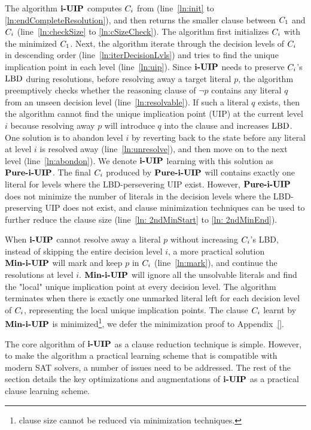 The algorithm $\textbf{i-UIP}$ computes $C_{i}$ from (line~\ref{ln:init} to \ref{ln:endCompleteResolution}), and then returns the smaller clause between 
$C_{1}$ and $C_{i}$ (line~\ref{ln:checkSize} to \ref{ln:cSizeCheck}). 
The algorithm first initializes $C_{i}$ with the minimized\cite{} $C_{1}$. Next, the algorithm iterate through the decision levels of $C_{i}$ in descending order (line~\ref{ln:iterDecisionLvls}) and tries to find the unique implication point in each level (line~\ref{ln:uip}). Since $\textbf{i-UIP}$ needs to preserve $C_{i}$'s $\text{LBD}$ during resolutions, before resolving away a target literal $p$, the algorithm preemptively checks whether the reasoning clause of $\neg{p}$ contains any literal $q$ from an unseen decision level (line~\ref{ln:resolvable}). If such a literal $q$ exists, then the algorithm cannot find the unique implication point (UIP) at the current level $i$ because resolving away $p$ will introduce $q$ into the clause and increases $\text{LBD}$. One solution is to abandon level $i$ by reverting back to the state before any literal at level $i$ is resolved away (line~\ref{ln:unresolve}), and then move on to the next level (line~\ref{ln:abondon}). We denote $\textbf{i-UIP}$ learning with this solution as $\textbf{Pure-i-UIP}$. The final $C_{i}$ produced by $\textbf{Pure-i-UIP}$ will contains exactly one literal for levels where the LBD-persevering UIP exist. However, $\textbf{Pure-i-UIP}$ does not minimize the number of literals in the decision levels where the LBD-preserving UIP does not exist, and clause minimization techniques\cite{} can be used to further reduce the clause size (line~\ref{ln: 2ndMinStart} to \ref{ln: 2ndMinEnd}). 

  When $\textbf{i-UIP}$ cannot resolve away a literal $p$ without increasing $C_{i}$'s LBD, instead of skipping the entire decision level $i$, a more practical solution $\textbf{Min-i-UIP}$ will mark and keep $p$ in $C_{i}$ (line~\ref{ln:mark}), and continue the resolutions at level $i$. $\textbf{Min-i-UIP}$ will ignore all the unsolvable literals and find the "local" unique implication point at every decision level.  The algorithm terminates when there is exactly one unmarked literal left for each decision level of $C_{i}$, representing the local unique implication points. The clause $C_{i}$ learnt by
  $\textbf{Min-i-UIP}$ is minimized\footnote{clause size cannot be reduced via minimization techniques\cite{}.}, we defer the minimization proof to Appendix~\ref{}.  

The core algorithm of $\textbf{i-UIP}$ as a clause reduction technique is simple. However, to make the algorithm a practical learning scheme that is compatible with modern SAT solvers, a number of issues need to be addressed. The rest of the section details the key optimizations and augmentations of $\textbf{i-UIP}$ as a practical clause learning scheme.

